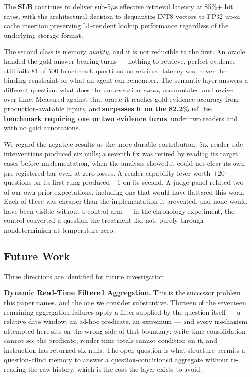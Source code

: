 \documentclass[10pt,twocolumn]{article}
\begin{document}
The \textbf{SLB} continues to deliver sub-5$\mu$s effective retrieval latency at 85\%+ hit rates, with the architectural decision to dequantize INT8 vectors to FP32 upon cache insertion preserving L1-resident lookup performance regardless of the underlying storage format.

The second class is memory \emph{quality}, and it is not reducible to the first. An oracle handed the gold answer-bearing turns --- nothing to retrieve, perfect evidence --- still fails 81 of 500 benchmark questions, so retrieval latency was never the binding constraint on what an agent can remember. The semantic layer answers a different question: what does the conversation \emph{mean}, accumulated and revised over time. Measured against that oracle it reaches gold-evidence accuracy from production-available inputs, and \textbf{surpasses it on the 82.2\% of the benchmark requiring one or two evidence turns}, under two readers and with no gold annotations.

We regard the negative results as the more durable contribution. Six reader-side interventions produced six nulls; a seventh fix was retired by reading its target cases before implementation, when the analysis showed it could not clear its own pre-registered bar even at zero losses. A reader-capability lever worth $+20$ questions on its first rung produced $-1$ on its second. A judge panel refuted two of our own prior expectations, including one that would have flattered this work. Each of these was cheaper than the implementation it prevented, and none would have been visible without a control arm --- in the chronology experiment, the control converted a question the treatment did not, purely through nondeterminism at temperature zero.

\subsection{Future Work}

Three directions are identified for future investigation.

\textbf{Dynamic Read-Time Filtered Aggregation.} This is the successor problem this paper names, and the one we consider substantive. Thirteen of the seventeen remaining aggregation failures apply a filter supplied by the question itself --- a relative date window, an ad-hoc predicate, an extremum --- and every mechanism attempted here sits on the wrong side of that boundary: write-time consolidation cannot see the predicate, render-time totals cannot condition on it, and instruction has returned six nulls. The open question is what structure permits a question-blind memory to answer a question-conditioned aggregate without re-reading the raw history, which is the cost the layer exists to avoid.
\end{document}
